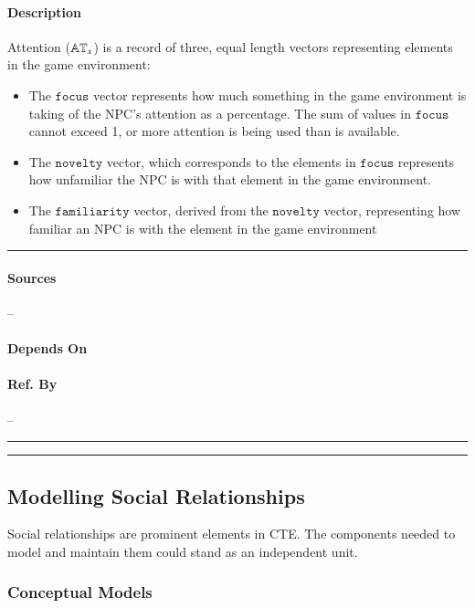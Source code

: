 \paragraph{Description} Attention ($\mathbb{AT}_x$) is a record of three,
equal length vectors representing elements in the game environment:
\begin{itemize}
    \item The $\mathtt{focus}$ vector represents how much something in the game
    environment is taking of the NPC's attention as a percentage. The sum of
    values in $\mathtt{focus}$ cannot exceed 1, or more attention is being used
    than is available.

    \item The $\mathtt{novelty}$ vector, which corresponds to the elements in
    $\mathtt{focus}$ represents how unfamiliar the NPC is with that element in
    the game environment.

    \item The $\mathtt{familiarity}$ vector, derived from the
    $\mathtt{novelty}$ vector, representing how familiar an NPC is with the
    element in the game environment
\end{itemize}\hrule

\paragraph{Sources} --

\paragraph{Depends On} 

\paragraph{Ref. By} -- \\\hrule\vspace{0.5mm}\hrule

\subsection{Modelling Social Relationships}
Social relationships are prominent elements in CTE. The components needed to
model and maintain them could stand as an independent unit.

\subsubsection{Conceptual Models}

